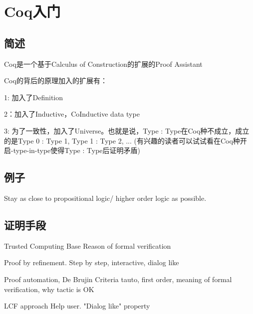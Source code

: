 \section{Coq入门}

\subsection{简述}
Coq是一个基于Calculus of Construction的扩展的Proof Assistant

Coq的背后的原理加入的扩展有：

1: 加入了Definition

2：加入了Inductive，CoInductive data type

3: 为了一致性，加入了Universe。也就是说，Type : Type在Coq种不成立，成立的是Type 0 : Type 1, Type 1 : Type 2, ... (有兴趣的读者可以试试看在Coq种开启-type-in-type使得Type : Type后证明矛盾)

\subsection{例子}
Stay as close to propositional logic/ higher order logic as possible.

\subsection{证明手段}
Trusted Computing Base
Reason of formal verification

Proof by refinement.
Step by step, interactive, dialog like

Proof automation, De Brujin Criteria
tauto, first order, meaning of formal verification, why tactic is OK

LCF approach
Help user. "Dialog like" property
